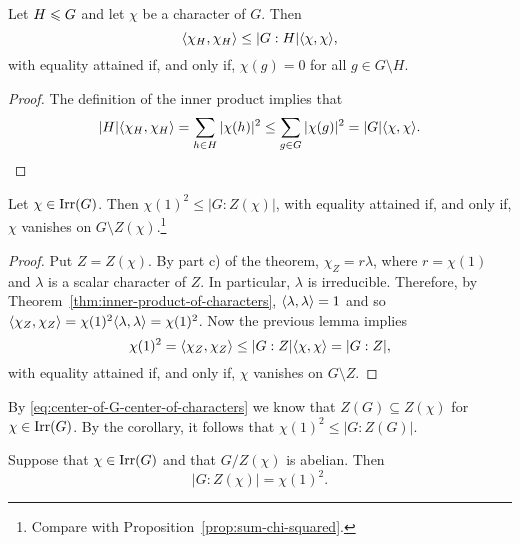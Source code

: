 \begin{lem}
    Let\/ $H\leqslant G$ and let\/ $\chi$ be a character of\/ $G$. Then
    $$
        \langle\chi_H,\chi_H\rangle\le |G:H|\langle\chi,\chi\rangle,
    $$
    with equality attained if, and only if, $\chi(g)=0$ for all\/ $g\in G\setminus H$.
\end{lem}

\begin{proof}
    The definition of the inner product implies that
    $$
        |H|\langle\chi_H,\chi_H\rangle
            = \sum_{h\in H}|\chi(h)|^2
            \le \sum_{g\in G}|\chi(g)|^2
            = |G|\langle\chi,\chi\rangle.
    $$
\end{proof}

\begin{cor}\label{cor:bounded-index-of-Z(chi)}
    Let\/ $\chi\in\operatorname{Irr}(G)$. Then\/ $\chi(1)^2\le |G:Z(\chi)|$, with equality attained if, and only if, $\chi$ vanishes on\/ $G\setminus Z(\chi)$.\footnote{Compare with Proposition~\ref{prop:sum-chi-squared}.}
\end{cor}

\begin{proof}
    Put $Z=Z(\chi)$. By part c) of the theorem, $\chi_Z=r\lambda$, where $r=\chi(1)$ and $\lambda$ is a scalar character of $Z$. In particular, $\lambda$ is irreducible. Therefore, by Theorem~\ref{thm:inner-product-of-characters}, $\langle\lambda,\lambda\rangle=1$ and so $\langle\chi_Z,\chi_Z\rangle=\chi(1)^2\langle\lambda,\lambda\rangle=\chi(1)^2$. Now the previous lemma implies
    $$
        \chi(1)^2=\langle\chi_Z,\chi_Z\rangle
            \le|G:Z|\langle\chi,\chi\rangle = |G:Z|,
    $$
    with equality attained if, and only if, $\chi$ vanishes on $G\setminus Z$.
\end{proof}

\begin{rem}
    By \eqref{eq:center-of-G-center-of-characters} we know that $Z(G)\subseteq Z(\chi)$ for $\chi\in\operatorname{Irr}(G)$. By the corollary, it follows that $\chi(1)^2\le|G:Z(G)|$.
\end{rem}

\begin{thm}
    Suppose that $\chi\in\operatorname{Irr}(G)$ and that $G/Z(\chi)$ is abelian. Then
    $$
        |G:Z(\chi)|=\chi(1)^{2}.
    $$
\end{thm}

